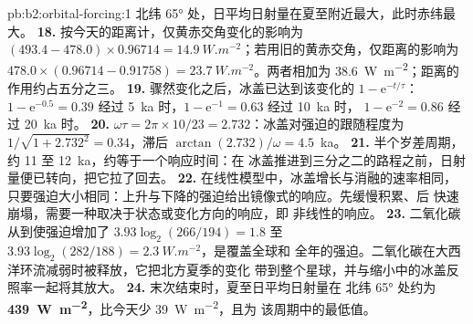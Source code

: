 \begin{solution}{pb:b2:orbital-forcing:1}
北纬 \ang{65} 处，日平均日射量在夏至附近最大，此时赤纬最大。
\textbf{18.} 按今天的距离计，仅黄赤交角变化的影响为 $(493.4 - 478.0) \times
0.96714 = \qty{14.9}{W.m^{-2}}$；若用旧的黄赤交角，仅距离的影响为 $478.0 \times
(0.96714 - 0.91758) = \qty{23.7}{W.m^{-2}}$。两者相加为 \qty{38.6}{W.m^{-2}}；距离的
作用约占五分之三。
\textbf{19.} 骤然变化之后，冰盖已达到该变化的 $1 - \mathrm e^{-t/\tau}$：
$1 - \mathrm e^{-0.5} = 0.39$ 经过 \qty{5}{ka} 时，$1 - \mathrm e^{-1} = 0.63$ 经过 \qty{10}{ka} 时，
$1 - \mathrm e^{-2} = 0.86$ 经过 \qty{20}{ka} 时。
\textbf{20.} $\omega\tau = 2\pi \times 10/23 = 2.732$：冰盖对强迫的跟随程度为 $1/\sqrt{1 + 2.732^2} =
0.34$，滞后 $\arctan(2.732)/\omega = 4.5$~ka。
\textbf{21.} 半个岁差周期，约 11 至 \qty{12}{ka}，约等于一个响应时间：在
冰盖推进到三分之二的路程之前，日射量便已转向，把它拉了回去。
\textbf{22.} 在线性模型中，冰盖增长与消融的速率相同，
只要强迫大小相同：上升与下降的强迫给出镜像式的响应。先缓慢积累、后
快速崩塌，需要一种取决于状态或变化方向的响应，即
非线性的响应。
\textbf{23.} 二氧化碳从到使强迫增加了 $3.93\log_2(266/194) = 1.8$ 至 $3.93\log_2(282/188) =
\qty{2.3}{W.m^{-2}}$，是覆盖全球和
全年的强迫。二氧化碳在大西洋环流减弱时被释放，它把北方夏季的变化
带到整个星球，并与缩小中的冰盖反照率一起将其放大。
\textbf{24.} 末次结束时，夏至日平均日射量在
北纬 \ang{65} 处约为 \textbf{\qty{439}{W.m^{-2}}}，比今天少 \qty{39}{W.m^{-2}}，且为
该周期中的最低值。
\end{solution}

